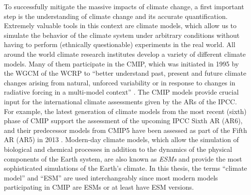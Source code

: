 To successfully mitigate the massive impacts of climate change, a first
important step is the understanding of climate change and its accurate
quantification. Extremely valuable tools in this context are climate models,
which allow us to simulate the behavior of the climate system under arbitrary
conditions without having to perform (ethnically questionable) experiments in
the real world. All around the world climate research institutes develop a
variety of different climate models. Many of them participate in the \ac{CMIP},
which was initiated in 1995 by the \ac{WGCM} of the \ac{WCRP} to
\enquote{better understand past, present and future climate changes arising
  from natural, unforced variability or in response to changes in radiative
  forcing in a multi-model context} \autocite{WCRP2020}. The \ac{CMIP} models
provide crucial input for the international climate assessments given by the
\acp{AR} of the \ac{IPCC}. For example, the latest generation of climate models
from the most recent (sixth) phase of \ac{CMIP}  support the assessment of the upcoming \ac{IPCC} Sixth
\acl{AR} (\acs{AR}6), and their predecessor models from \acs{CMIP}5
\autocite{Taylor2012} have been assessed as part of the Fifth \acl{AR}
(\acs{AR}5) in 2013 \autocite{Flato2013}. Modern-day climate models, which
allow the simulation of biological and chemical processes in addition to the
dynamics of the physical components of the Earth system, are also known as
\emph{\acp{ESM}} and provide the most sophisticated simulations of the Earth's
climate. In this thesis, the terms \enquote{climate model} and
\enquote{\acl{ESM}} are used interchangeably since most modern models
participating in \ac{CMIP} are \acp{ESM} or at least have \ac{ESM} versions.

